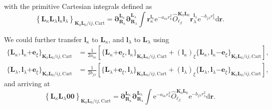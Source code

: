 \documentclass[a4paper,11pt,twoside,openright]{book}
\begin{document}
with the primitive Cartesian integrals defined as~\cite{bgkrth-a,bgkr}
\begin{equation}
  \label{eq:prim-cgto-ints}
  \left\{\boldsymbol{L}_{\kappa}\boldsymbol{L}_{\lambda}%
    \boldsymbol{l}_{\kappa}\boldsymbol{l}_{\lambda}\right\}_{\boldsymbol{K}_{0}\boldsymbol{L}_{0}/ij,\text{Cart}}
  =\boldsymbol{\partial}_{\boldsymbol{R}_{\kappa}}^{\boldsymbol{L}_{\kappa}}%
    \boldsymbol{\partial}_{\boldsymbol{R}_{\lambda}}^{\boldsymbol{L}_{\lambda}}%
    \int\boldsymbol{r}_{\kappa}^{\boldsymbol{l}_{\kappa}}\mathrm{e}^{-a_{i\kappa}r_{\kappa}^2}%
    \hat{O}_{\ell_{\beta}}^{\boldsymbol{K}_{0}\boldsymbol{L}_{0}}%
    \boldsymbol{r}_{\lambda}^{\boldsymbol{l}_{\lambda}}%
    \mathrm{e}^{-b_{j\lambda}r_{\lambda}^2}\mathrm{d}\boldsymbol{r}.
\end{equation}

We could further transfer $\boldsymbol{l}_{\kappa}$ to $\boldsymbol{L}_{\kappa}$,
and $\boldsymbol{l}_{\lambda}$ to $\boldsymbol{L}_{\lambda}$ using
\begin{align}
  \{\boldsymbol{L}_{\kappa},\boldsymbol{l}_{\kappa}%
    \mathrm{+}\boldsymbol{e}_{\xi}\}_{\boldsymbol{K}_{0}\boldsymbol{L}_{0}/ij,\text{Cart}}
  \label{eq:recurrence-angular-cart-bra}
  &=\frac{1}{2a_{i\kappa}}\left[%
    \{\boldsymbol{L}_{\kappa}\mathrm{+}\boldsymbol{e}_{\xi},%
      \boldsymbol{l}_{\kappa}\}_{\boldsymbol{K}_{0}\boldsymbol{L}_{0}/ij,\text{Cart}}
  +(\boldsymbol{l}_{\kappa})_{\xi}%
    \{\boldsymbol{L}_{\kappa},\boldsymbol{l}_{\kappa}%
      \mathrm{-}\boldsymbol{e}_{\xi}\}_{\boldsymbol{K}_{0}\boldsymbol{L}_{0}/ij,\text{Cart}}\right],\\
%
  \{\boldsymbol{L}_{\lambda},\boldsymbol{l}_{\lambda}%
    \mathrm{+}\boldsymbol{e}_{\xi}\}_{\boldsymbol{K}_{0}\boldsymbol{L}_{0}/ij,\text{Cart}}
  \label{eq:recurrence-angular-cart-ket}
  &=\frac{1}{2b_{j\lambda}}\left[%
    \{\boldsymbol{L}_{\lambda}\mathrm{+}\boldsymbol{e}_{\xi},%
      \boldsymbol{l}_{\lambda}\}_{\boldsymbol{K}_{0}\boldsymbol{L}_{0}/ij,\text{Cart}}
  +(\boldsymbol{l}_{\lambda})_{\xi}%
    \{\boldsymbol{L}_{\lambda},\boldsymbol{l}_{\lambda}%
      \mathrm{-}\boldsymbol{e}_{\xi}\}_{\boldsymbol{K}_{0}\boldsymbol{L}_{0}/ij,\text{Cart}}\right],
\end{align}
and arriving at
\begin{equation}
  \left\{\boldsymbol{L}_{\kappa}\boldsymbol{L}_{\lambda}%
    \boldsymbol{00}\right\}_{\boldsymbol{K}_{0}\boldsymbol{L}_{0}/ij,\text{Cart}}
  =\boldsymbol{\partial}_{\boldsymbol{R}_{\kappa}}^{\boldsymbol{L}_{\kappa}}%
    \boldsymbol{\partial}_{\boldsymbol{R}_{\lambda}}^{\boldsymbol{L}_{\lambda}}%
    \int\mathrm{e}^{-a_{i\kappa}r_{\kappa}^2}%
    \hat{O}_{\ell_{\beta}}^{\boldsymbol{K}_{0}\boldsymbol{L}_{0}}%
    \mathrm{e}^{-b_{j\lambda}r_{\lambda}^2}\mathrm{d}\boldsymbol{r}.
\end{equation}
\end{document}

